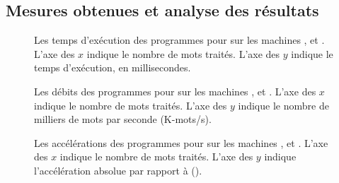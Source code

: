 \subsection{Mesures obtenues et analyse des r\'esultats}



\begin{figure}




\caption[Les temps d'exécution des programmes pour  sur
les machines ,  et .]{Les temps d'exécution des programmes
pour  sur les machines ,  et . L'axe des $x$
indique le nombre de mots traités. L'axe des $y$ indique le temps
d'exécution, en millisecondes.}
\label{WordCount-temps.fig}
\end{figure}


\begin{figure}




\caption[Les débits pour  sur
les machines ,  et .]{Les débits des programmes
pour  sur les machines ,  et . L'axe des $x$
indique le nombre de mots traités. L'axe des $y$ indique le nombre de
milliers de mots par seconde (K-mots/s).}
\label{WordCount-debits.fig}
\end{figure}


\begin{figure}





\caption[Les accélérations pour  sur les machines ,
 et .]{Les accélérations des programmes pour  sur
les machines ,  et . L'axe des $x$ indique le nombre de mots
traités. L'axe des $y$ indique l'accélération absolue par rapport à
 ().}
\label{WordCount-accs.fig}
\end{figure}


